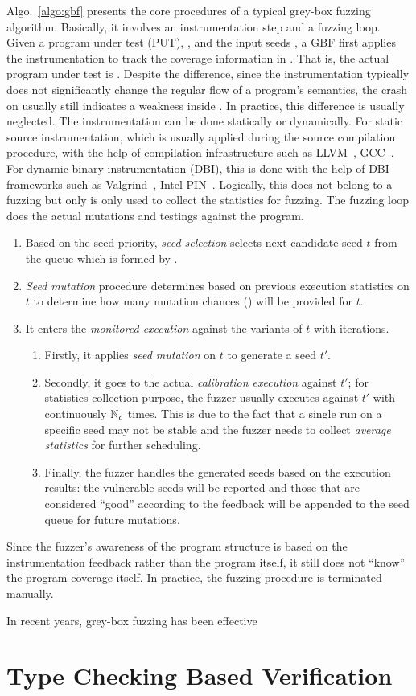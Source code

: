 Algo.~\ref{algo:gbf} presents the core procedures of a typical grey-box fuzzing algorithm. Basically, it involves an instrumentation step and a fuzzing loop.
Given a program under test (PUT), \ProgO, and the input seeds \Seeds, a GBF first applies the instrumentation to track the coverage information in \ProgO. That is, the actual program under test is \Prog. Despite the difference, since the instrumentation typically does not significantly change the regular flow of a program's semantics, the crash on \Prog usually still indicates a weakness inside \ProgO. In practice, this difference is usually neglected.
The instrumentation can be done statically or dynamically. For static source instrumentation, which is usually applied during the source compilation procedure, with the help of compilation infrastructure such as LLVM~\cite{Lattner:2004:LCF:977395.977673}, GCC~\cite{gcc}. For dynamic binary instrumentation (DBI), this is done with the help of DBI frameworks such as Valgrind~\cite{valgrind}, Intel PIN~\cite{pin}. Logically, this does not belong to a fuzzing but only is only used to collect the statistics for fuzzing.
The fuzzing loop does the actual mutations and testings against the program.
\begin{enumerate}
	\item Based on the seed priority, \emph{seed selection} selects next candidate seed $t$ from the queue which is formed by \Seeds.
	\item \emph{Seed mutation} procedure determines based on previous execution statistics on $t$ to determine how many mutation chances (\mutChance) will be provided for $t$.
	\item It enters the \emph{monitored execution} against the variants of $t$ with \mutChance iterations. 
	\begin{enumerate}
	\item Firstly, it applies \emph{seed mutation} on $t$ to generate a seed $t'$. 
	\item Secondly, it goes to the actual \emph{calibration execution} against $t'$; for statistics collection purpose, the fuzzer usually executes \Prog against $t'$ with continuously $\mathbb{N}_{c}$ times. This is due to the fact that a single run on a specific seed may not be stable and the fuzzer needs to collect \emph{average statistics} for further scheduling.
	\item Finally, the fuzzer handles the generated seeds based on the execution results: the vulnerable seeds will be reported and those that are considered ``good'' according to the feedback will be appended to the seed queue for future mutations.
	\end{enumerate}
\end{enumerate}
Since the fuzzer's awareness of the program structure is based on the instrumentation feedback rather than the program itself, it still does not ``know'' the program coverage itself. In practice, the fuzzing procedure is terminated manually.

In recent years, grey-box fuzzing has been effective


\section{Type Checking Based Verification}


